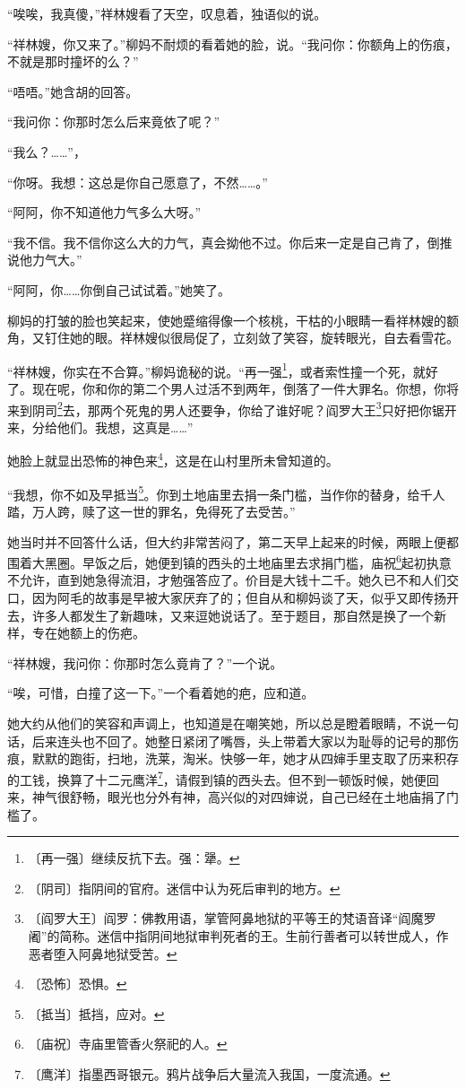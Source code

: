\documentclass[12pt,UTF-8,openany]{ctexbook}
\begin{document}
\begin{normalsize}
    “唉唉，我真傻，”祥林嫂看了天空，叹息着，独语似的说。
    
    “祥林嫂，你又来了。”柳妈不耐烦的看着她的脸，说。“我问你：你额角上的伤痕，不就是那时撞坏的么？”
    
    “唔唔。”她含胡的回答。
    
    “我问你：你那时怎么后来竟依了呢？”
    
    “我么？……”，
    
    “你呀。我想：这总是你自己愿意了，不然……。”
    
    “阿阿，你不知道他力气多么大呀。”
    
    “我不信。我不信你这么大的力气，真会拗他不过。你后来一定是自己肯了，倒推说他力气大。”
    
    “阿阿，你……你倒自己试试着。”她笑了。
    
    柳妈的打皱的脸也笑起来，使她蹙缩得像一个核桃，干枯的小眼睛一看祥林嫂的额角，又钉住她的眼。祥林嫂似很局促了，立刻敛了笑容，旋转眼光，自去看雪花。
    
    “祥林嫂，你实在不合算。”柳妈诡秘的说。“再一强\footnote{〔再一强〕继续反抗下去。强：犟。}，或者索性撞一个死，就好了。现在呢，你和你的第二个男人过活不到两年，倒落了一件大罪名。你想，你将来到阴司\footnote{〔阴司〕指阴间的官府。迷信中认为死后审判的地方。}去，那两个死鬼的男人还要争，你给了谁好呢？阎罗大王\footnote{〔阎罗大王〕阎罗：佛教用语，掌管阿鼻地狱的平等王的梵语音译“阎魔罗阇”的简称。迷信中指阴间地狱审判死者的王。生前行善者可以转世成人，作恶者堕入阿鼻地狱受苦。}只好把你锯开来，分给他们。我想，这真是……”
    
    她脸上就显出恐怖的神色来\footnote{〔恐怖〕恐惧。}，这是在山村里所未曾知道的。
    
    “我想，你不如及早抵当\footnote{〔抵当〕抵挡，应对。}。你到土地庙里去捐一条门槛，当作你的替身，给千人踏，万人跨，赎了这一世的罪名，免得死了去受苦。”
    
    她当时并不回答什么话，但大约非常苦闷了，第二天早上起来的时候，两眼上便都围着大黑圈。早饭之后，她便到镇的西头的土地庙里去求捐门槛，庙祝\footnote{〔庙祝〕寺庙里管香火祭祀的人。}起初执意不允许，直到她急得流泪，才勉强答应了。价目是大钱十二千。她久已不和人们交口，因为阿毛的故事是早被大家厌弃了的；但自从和柳妈谈了天，似乎又即传扬开去，许多人都发生了新趣味，又来逗她说话了。至于题目，那自然是换了一个新样，专在她额上的伤疤。
    
    “祥林嫂，我问你：你那时怎么竟肯了？”一个说。
    
    “唉，可惜，白撞了这一下。”一个看着她的疤，应和道。
    
    她大约从他们的笑容和声调上，也知道是在嘲笑她，所以总是瞪着眼睛，不说一句话，后来连头也不回了。她整日紧闭了嘴唇，头上带着大家以为耻辱的记号的那伤痕，默默的跑街，扫地，洗莱，淘米。快够一年，她才从四婶手里支取了历来积存的工钱，换算了十二元鹰洋\footnote{〔鹰洋〕指墨西哥银元。鸦片战争后大量流入我国，一度流通。}，请假到镇的西头去。但不到一顿饭时候，她便回来，神气很舒畅，眼光也分外有神，高兴似的对四婶说，自己已经在土地庙捐了门槛了。
    

\end{normalsize}
\end{document}

